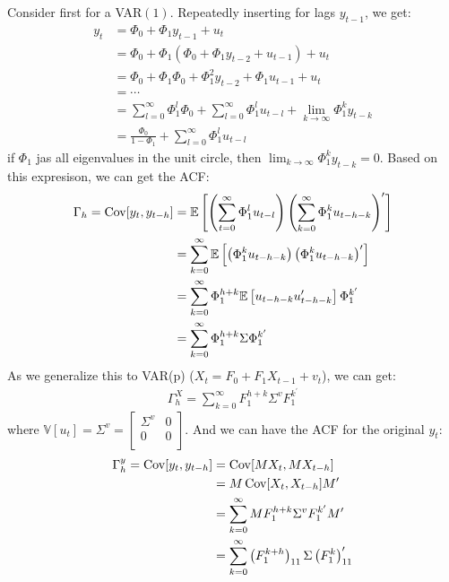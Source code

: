 Consider first for a VAR$(1)$. Repeatedly inserting for lags $y_{t-1}$, we get:
\begin{align*}
    y_t &= \Phi_0 + \Phi_1 y_{t-1} + u_t \\
    &= \Phi_0 + \Phi_1 (\Phi_0 + \Phi_1 y_{t-2} + u_{t-1}) + u_t \\
    &= \Phi_0 + \Phi_1 \Phi_0 + \Phi_1^2 y_{t-2} + \Phi_1 u_{t-1} + u_t \\
    &= \cdots \\
    &= \sum_{l=0}^{\infty} \Phi_1^l \Phi_0 + \sum_{l=0}^{\infty} \Phi_1^l u_{t-l} + \lim_{k \to \infty} \Phi_1^k y_{t-k} \\
    &= \frac{\Phi_0}{1 - \Phi_1} + \sum_{l=0}^{\infty} \Phi_1^l u_{t-l}
\end{align*}
if $\Phi_1$ jas all eigenvalues in the unit circle, then $\lim_{k \to \infty} \Phi_1^k y_{t-k} = 0$.
Based on this expresison, we can get the ACF:
\begin{align*}
    \Gamma_h = \operatorname{Cov}[y_t, y_{t-h}] &= \mathbb{E}\left[ \left(\sum_{t=0}^{\infty}\Phi_1^l u_{t-l} \right) \left( \sum_{k=0}^{\infty}\Phi_1^k u_{t-h-k} \right)^{\prime} \right] \\
    &= \sum_{k=0}^{\infty} \mathbb{E}\left[ \left(\Phi_1^k u_{t-h-k} \right) \left(\Phi_1^k u_{t-h-k} \right)^{\prime} \right] \\
    &= \sum_{k=0}^{\infty} \Phi_1^{h+k}  \mathbb{E}\left[ u_{t-h-k} u_{t-h-k}^{\prime} \right] \Phi_1^{k^{\prime}} \\
    &= \sum_{k=0}^{\infty} \Phi_1^{h+k} \Sigma \Phi_1^{k^{\prime}}
\end{align*}
As we generalize this to VAR(p) ($X_t = F_0 + F_1 X_{t-1} + v_t$), we can get:
\begin{gather*}
    \Gamma_h^X = \sum_{k=0}^{\infty} F_1^{h+k} \Sigma^v F_1^{k^{\prime}}
\end{gather*}
where $\mathbb{V}[u_t] = \Sigma^v = \begin{bmatrix}
    \Sigma^v & 0 \\
    0 & 0 \\
\end{bmatrix}$.
And we can have the ACF for the original $y_t$:
\begin{align*}
    \Gamma_h^y = \operatorname{Cov}[y_t, y_{t-h}] &= \operatorname{Cov}[MX_t, MX_{t-h}] \\
    &= M \operatorname{Cov}[X_t, X_{t-h}] M^{\prime} \\
    &= \sum_{k=0}^{\infty} M F_1^{h+k} \Sigma^v F_1^{k^{\prime}} M^{\prime} \\
    &= \sum_{k=0}^{\infty} \left(F_1^{k+h} \right)_{11} \Sigma \left( F_1^k \right)_{11}^{\prime}
\end{align*}

